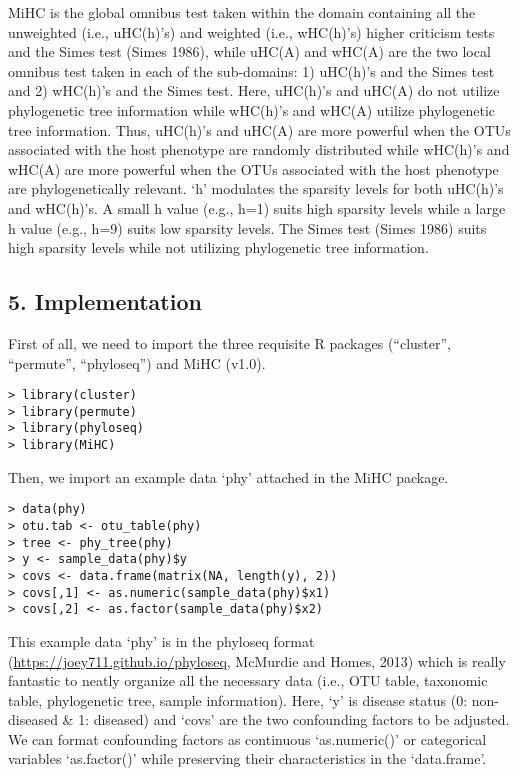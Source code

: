 \documentclass[
]{article}
\begin{document}
MiHC is the global omnibus test taken within the domain containing all
the unweighted (i.e., uHC(h)'s) and weighted (i.e., wHC(h)'s) higher
criticism tests and the Simes test (Simes 1986), while uHC(A) and wHC(A)
are the two local omnibus test taken in each of the sub-domains: 1)
uHC(h)'s and the Simes test and 2) wHC(h)'s and the Simes test. Here,
uHC(h)'s and uHC(A) do not utilize phylogenetic tree information while
wHC(h)'s and wHC(A) utilize phylogenetic tree information. Thus,
uHC(h)'s and uHC(A) are more powerful when the OTUs associated with the
host phenotype are randomly distributed while wHC(h)'s and wHC(A) are
more powerful when the OTUs associated with the host phenotype are
phylogenetically relevant. `h' modulates the sparsity levels for both
uHC(h)'s and wHC(h)'s. A small h value (e.g., h=1) suits high sparsity
levels while a large h value (e.g., h=9) suits low sparsity levels. The
Simes test (Simes 1986) suits high sparsity levels while not utilizing
phylogenetic tree information.

\hypertarget{implementation}{%
\subsection{5. Implementation}\label{implementation}}

First of all, we need to import the three requisite R packages
(``cluster'', ``permute'', ``phyloseq'') and MiHC (v1.0).

\begin{verbatim}
> library(cluster)
> library(permute)
> library(phyloseq)
> library(MiHC)
\end{verbatim}

Then, we import an example data `phy' attached in the MiHC package.

\begin{verbatim}
> data(phy)
> otu.tab <- otu_table(phy)
> tree <- phy_tree(phy)
> y <- sample_data(phy)$y
> covs <- data.frame(matrix(NA, length(y), 2))
> covs[,1] <- as.numeric(sample_data(phy)$x1)
> covs[,2] <- as.factor(sample_data(phy)$x2)
\end{verbatim}

This example data `phy' is in the phyloseq format
(\url{https://joey711.github.io/phyloseq}, McMurdie and Homes, 2013)
which is really fantastic to neatly organize all the necessary data
(i.e., OTU table, taxonomic table, phylogenetic tree, sample
information). Here, `y' is disease status (0: non-diseased \& 1:
diseased) and `covs' are the two confounding factors to be adjusted. We
can format confounding factors as continuous `as.numeric()' or
categorical variables `as.factor()' while preserving their
characteristics in the `data.frame'.
\end{document}
